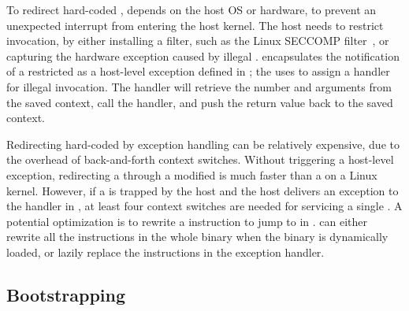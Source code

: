 

To redirect hard-coded \linuxapis{},
\thelibos{} depends on the host OS or hardware, to prevent an unexpected \linuxapi{} interrupt from entering the host kernel.
The host needs to restrict \linuxapi{} invocation,
by either installing a \linuxapi{} filter,
such as the Linux SECCOMP filter~\cite{seccomp},
or capturing the hardware exception caused by illegal \linuxapis{}.
\graphene{} encapsulates
the notification of a restricted \linuxapi{} as a host-level exception
defined in \thehostabi{};
\thelibos{} the uses 
to assign a handler for illegal \linuxapi{} invocation.
The handler will
retrieve the \linuxapi{} number and arguments
from the saved context,
call the \linuxapi{} handler,
and push the \linuxapi{} return value back to the saved context.



Redirecting hard-coded \linuxapis{} by exception handling
can be relatively expensive,
due to the overhead of back-and-forth context switches.
Without triggering a host-level exception,
redirecting a \linuxapi{} through a modified \libc{} is much faster than
a \linuxapi{} on a Linux kernel.
However, if a \linuxapi{} is trapped by the host
and the host delivers an exception to the handler in \thelibos{},
at least four context switches
are needed for servicing a single \linuxapi{}.
A potential optimization is to rewrite %
a  instruction
to jump to  in \thelibos{}.
\thelibos{} can either rewrite all the  instructions in
the whole binary when the binary is dynamically loaded,
or lazily replace the  instructions in the exception handler.










\subsection{Bootstrapping}


\thelibos{}



